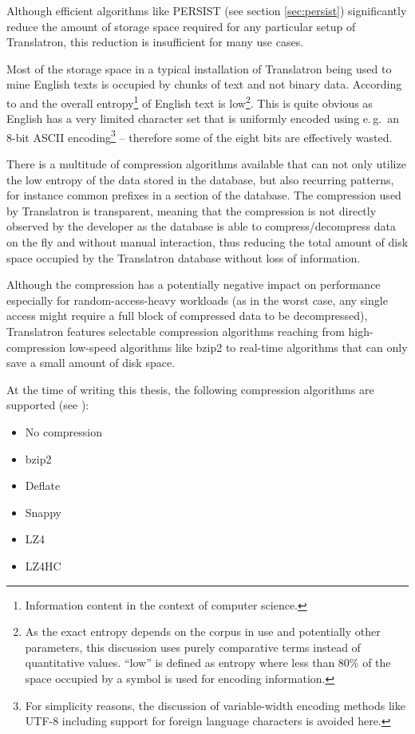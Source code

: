\documentclass[a4paper, 12pt, twoside, reqn]{report}
\numberwithin{figure}{chapter}
\newtheorem[L]{boxedDefinition}{Definition}
\newtheorem[L]{boxedExample}{Example}
\newcommand{\eg}{e.\,g.\ }
\begin{document}
Although efficient algorithms like PERSIST (see section \ref{sec:persist}) significantly reduce the amount of storage space required for any particular setup of Translatron, this reduction is insufficient for many use cases.

Most of the storage space in a typical installation of Translatron being used to mine English texts is occupied by chunks of text and not binary data. According to \cite{shannon1951prediction} and \cite{brown1992estimate} the overall entropy\footnote{Information content in the context of computer science.} of English text is low\footnote{As the exact entropy depends on the corpus in use and potentially other parameters, this discussion uses purely comparative terms instead of quantitative values. ``low'' is defined as entropy where less than 80\% of the space occupied by a symbol is used for encoding information.}. This is quite obvious as English has a very limited character set that is uniformly encoded using \eg an 8-bit ASCII encoding\footnote{For simplicity reasons, the discussion of variable-width encoding methods like UTF-8 including support for foreign language characters is avoided here.} -- therefore some of the eight bits are effectively wasted.

There is a multitude of compression algorithms available that can not only utilize the low entropy of the data stored in the database, but also recurring patterns, for instance common prefixes in a section of the database. The compression used by Translatron is transparent, meaning that the compression is not directly observed by the developer as the database is able to compress/decompress data on the fly and without manual interaction, thus reducing the total amount of disk space occupied by the Translatron database without loss of information.

Although the compression has a potentially negative impact on performance especially for random-access-heavy workloads (as in the worst case, any single access might require a full block of compressed data to be decompressed), Translatron features selectable compression algorithms reaching from high-compression low-speed algorithms like bzip2 to real-time algorithms that can only save a small amount of disk space.

At the time of writing this thesis, the following compression algorithms are supported (see \cite{rocksdb-source}):
\begin{itemize}
 \item No compression
 \item bzip2
 \item Deflate
 \item Snappy
 \item LZ4
 \item LZ4HC
\end{itemize}
\end{document}
